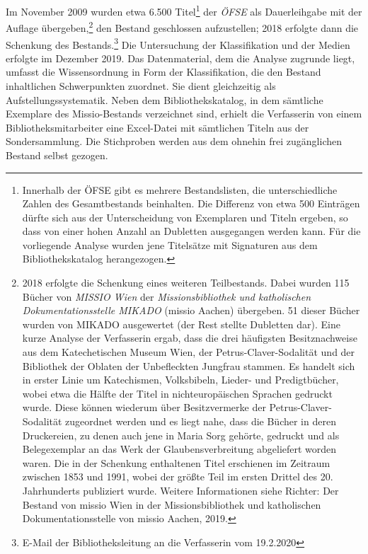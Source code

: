 \documentclass[a4paper,
fontsize=11pt,
oneside,
numbers=noperiodatend,
parskip=half-,
bibliography=totoc,
final
]{scrartcl}
\begin{document}
Im November 2009 wurden etwa 6.500 Titel\footnote{Innerhalb der ÖFSE
  gibt es mehrere Bestandslisten, die unterschiedliche Zahlen des
  Gesamtbestands beinhalten. Die Differenz von etwa 500 Einträgen dürfte
  sich aus der Unterscheidung von Exemplaren und Titeln ergeben, so dass
  von einer hohen Anzahl an Dubletten ausgegangen werden kann. Für die
  vorliegende Analyse wurden jene Titelsätze mit Signaturen aus dem
  Bibliothekskatalog herangezogen.} der \emph{ÖFSE} als Dauerleihgabe
mit der Auflage übergeben,\footnote{2018 erfolgte die Schenkung eines
  weiteren Teilbestands. Dabei wurden 115 Bücher von \emph{MISSIO Wien}
  der \emph{Missionsbibliothek und katholischen Dokumentationsstelle
  MIKADO} (missio Aachen) übergeben. 51 dieser Bücher wurden von MIKADO
  ausgewertet (der Rest stellte Dubletten dar). Eine kurze Analyse der
  Verfasserin ergab, dass die drei häufigsten Besitznachweise aus dem
  Katechetischen Museum Wien, der Petrus-Claver-Sodalität und der
  Bibliothek der Oblaten der Unbefleckten Jungfrau stammen. Es handelt
  sich in erster Linie um Katechismen, Volksbibeln, Lieder- und
  Predigtbücher, wobei etwa die Hälfte der Titel in nichteuropäischen
  Sprachen gedruckt wurde. Diese können wiederum über Besitzvermerke der
  Petrus-Claver-Sodalität zugeordnet werden und es liegt nahe, dass die
  Bücher in deren Druckereien, zu denen auch jene in Maria Sorg gehörte,
  gedruckt und als Belegexemplar an das Werk der Glaubensverbreitung
  abgeliefert worden waren. Die in der Schenkung enthaltenen Titel
  erschienen im Zeitraum zwischen 1853 und 1991, wobei der größte Teil
  im ersten Drittel des 20. Jahrhunderts publiziert wurde. Weitere
  Informationen siehe Richter: Der Bestand von missio Wien in der
  Missionsbibliothek und katholischen Dokumentationsstelle von missio
  Aachen, 2019.} den Bestand geschlossen aufzustellen; 2018 erfolgte
dann die Schenkung des Bestands.\footnote{E-Mail der Bibliotheksleitung
  an die Verfasserin vom 19.2.2020} Die Untersuchung der Klassifikation
und der Medien erfolgte im Dezember 2019. Das Datenmaterial, dem die
Analyse zugrunde liegt, umfasst die Wissensordnung in Form der
Klassifikation, die den Bestand inhaltlichen Schwerpunkten zuordnet. Sie
dient gleichzeitig als Aufstellungssystematik. Neben dem
Bibliothekskatalog, in dem sämtliche Exemplare des Missio-Bestands
verzeichnet sind, erhielt die Verfasserin von einem
Bibliotheksmitarbeiter eine Excel-Datei mit sämtlichen Titeln aus der
Sondersammlung. Die Stichproben werden aus dem ohnehin frei zugänglichen
Bestand selbst gezogen.
\end{document}
